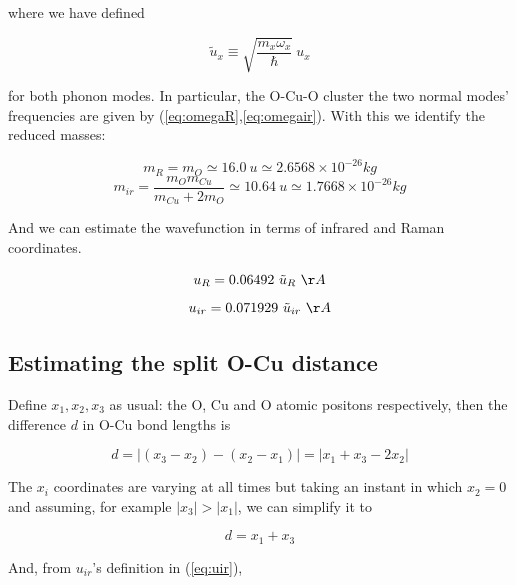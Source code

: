 where we have defined 

\begin{equation}\label{eq:uTildeDef}
\tilde{u}_x \equiv \sqrt{\frac{m_x\omega_x}{\hbar}}\ u_x
\end{equation}

for both phonon modes. In particular, the O-Cu-O cluster the two normal modes' frequencies are given by (\ref{eq:omegaR},\ref{eq:omegair}). With this we identify the reduced masses:

\begin{equation}\label{eq:redMassR}
m_R = m_O \simeq 16.0\ u \simeq 2.6568 \times 10^{-26} kg
\end{equation}
\begin{equation}\label{eq:redMassIr}
m_{ir}=\frac{m_Om_{Cu}}{m_{Cu}+2m_O} \simeq 10.64\ u \simeq 1.7668 \times 10^{-26}kg
\end{equation}

And we can estimate the wavefunction in terms of infrared and Raman coordinates.

\begin{equation}\label{eq:uRvstildeuR}
u_R = 0.06492\ \tilde{u}_R\ \AA
\end{equation}
\begin{equation}\label{eq:uirvstildeuir}
u_{ir} = 0.071929\ \tilde{u}_{ir}\ \AA
\end{equation}


\subsection{Estimating the split O-Cu distance}

Define $x_1,x_2,x_3$ as usual: the O, Cu and O atomic positons respectively, then the difference $d$ in O-Cu bond lengths is

\begin{equation}\label{eq:bondDiff}
d= \left| (x_3 - x_2) - (x_2 - x_1) \right| = \left| x_1 + x_3 - 2x_2 \right|
\end{equation}

The $x_i$ coordinates are varying at all times but taking an instant in which $x_2=0$ and assuming, for example $|x_3|>|x_1|$, we can simplify it to

\begin{equation}\label{eq:bondDiffSimpl}
d=x_1+x_3
\end{equation}

And, from $u_{ir}$'s definition in (\ref{eq:uir}),

